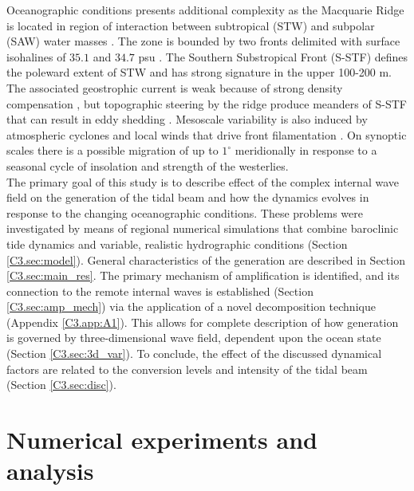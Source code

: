 \documentclass[12pt]{article}
\begin{document}
Oceanographic conditions presents additional complexity as the Macquarie Ridge is located in region 
of interaction 
between 
subtropical (STW) and subpolar (SAW) water masses \citep{chiswell2015physical}. 
The zone is bounded by two fronts delimited with surface isohalines of $35.1$ and $34.7$ psu
\citep{belkin1996southern, hamilton2006structure} . The Southern 
Substropical Front 
(S-STF) defines the poleward extent of STW and has strong signature in the upper 100-200 m. The 
associated geostrophic current is weak because of strong density compensation 
\citep{graham2013dynamical}, but topographic 
steering by the ridge produce meanders of S-STF that can result in eddy shedding 
\citep{smith2013interaction}. Mesoscale variability is also induced by atmospheric cyclones and 
local winds that drive front filamentation \citep{james2002summer}. On synoptic scales there is a 
possible 
migration of up to $1^{\circ}$ meridionally \citep{smith2017variability} in response to a seasonal 
cycle of 
insolation and strength of the westerlies.\\

The primary goal of this study is to describe effect of the complex internal wave field on the 
generation of the tidal beam and how the dynamics evolves in response to the changing 
oceanographic conditions. These problems were investigated by means of regional numerical 
simulations that 
combine baroclinic tide dynamics and variable, realistic hydrographic conditions (Section 
\ref{C3.sec:model}). General 
characteristics of the generation are described in Section \ref{C3.sec:main_res}. The primary 
mechanism of 
amplification is identified, and its connection to the remote internal waves is established 
(Section \ref{C3.sec:amp_mech}) via the application of a novel decomposition technique (Appendix 
\ref{C3.app:A1}). 
This allows for 
complete description of how generation is governed by three-dimensional wave field, dependent upon 
the ocean state (Section \ref{C3.sec:3d_var}). To conclude, the effect of the discussed dynamical 
factors are related to the conversion levels and intensity of the tidal beam 
(Section \ref{C3.sec:disc}).\\
 
\newpage

\section{Numerical experiments and analysis}
\end{document}
